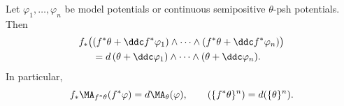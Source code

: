 \begin{theorem}\label{thm:finite-ma-projection}
Let \(\varphi_1,\ldots,\varphi_n\) be model potentials or continuous
semipositive \(\theta\)-psh potentials.  Then
\begin{equation}
\label{eq:finite-ma-projection}
\begin{split}
 f_*\bigl(& (f^*\theta+\ddc f^*\varphi_1)\wedge\cdots\wedge
                 (f^*\theta+\ddc f^*\varphi_n)\bigr)\\
 & =d\,(\theta+\ddc\varphi_1)\wedge\cdots\wedge
                 (\theta+\ddc\varphi_n).
\end{split}
\end{equation}
In particular,
\begin{equation}
\label{eq:finite-diagonal-projection}
 f_*\MA_{f^*\theta}(f^*\varphi)=d\MA_\theta(\varphi),
 \qquad
 (\{f^*\theta\}^n)=d(\{\theta\}^n).
\end{equation}
\end{theorem}

